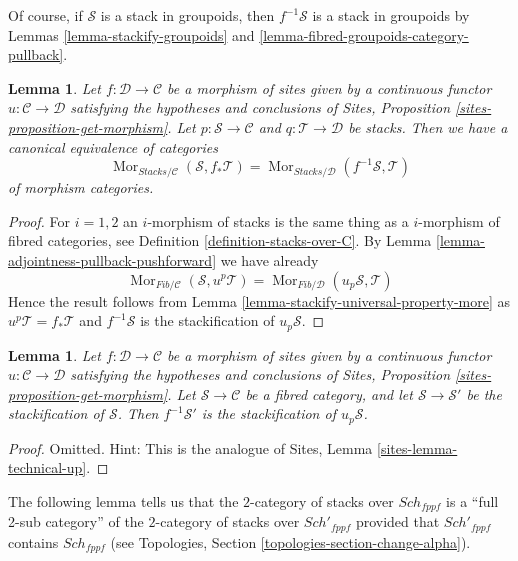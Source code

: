 \documentclass{stacks-project}
\theoremstyle{plain}
\newtheorem{lemma}[subsection]{Lemma}
\theoremstyle{definition}
\theoremstyle{remark}
\numberwithin{equation}{subsection}
\def\Sch{\mathit{Sch}}
\def\Mor{\mathop{\mathrm{Mor}}\nolimits}
\begin{document}
\noindent
Of course, if $\mathcal{S}$ is a stack in groupoids, then $f^{-1}\mathcal{S}$
is a stack in groupoids by
Lemmas \ref{lemma-stackify-groupoids} and
\ref{lemma-fibred-groupoids-category-pullback}.

\begin{lemma}
\label{lemma-adjointness-pullback-pushforward-stacks}
Let $f : \mathcal{D} \to \mathcal{C}$ be a morphism of sites
given by a continuous functor $u : \mathcal{C} \to \mathcal{D}$
satisfying the hypotheses and conclusions of
Sites, Proposition \ref{sites-proposition-get-morphism}.
Let $p : \mathcal{S} \to \mathcal{C}$ and
$q : \mathcal{T} \to \mathcal{D}$ be stacks.
Then we have a canonical equivalence of categories
$$
\Mor_{\textit{Stacks}/\mathcal{C}}(\mathcal{S}, f_*\mathcal{T})
=
\Mor_{\textit{Stacks}/\mathcal{D}}(f^{-1}\mathcal{S}, \mathcal{T})
$$
of morphism categories.
\end{lemma}

\begin{proof}
For $i = 1, 2$ an $i$-morphism of stacks is the same thing as a
$i$-morphism of fibred categories, see
Definition \ref{definition-stacks-over-C}.
By
Lemma \ref{lemma-adjointness-pullback-pushforward}
we have already
$$
\Mor_{\textit{Fib}/\mathcal{C}}(\mathcal{S}, u^p\mathcal{T})
=
\Mor_{\textit{Fib}/\mathcal{D}}(u_p\mathcal{S}, \mathcal{T})
$$
Hence the result follows from
Lemma \ref{lemma-stackify-universal-property-more}
as $u^p\mathcal{T} = f_*\mathcal{T}$ and $f^{-1}\mathcal{S}$ is the
stackification of $u_p\mathcal{S}$.
\end{proof}

\begin{lemma}
\label{lemma-technical-up}
Let $f : \mathcal{D} \to \mathcal{C}$ be a morphism of sites
given by a continuous functor $u : \mathcal{C} \to \mathcal{D}$
satisfying the hypotheses and conclusions of
Sites, Proposition \ref{sites-proposition-get-morphism}.
Let $\mathcal{S} \to \mathcal{C}$ be a fibred category, and
let $\mathcal{S} \to \mathcal{S}'$ be the stackification of $\mathcal{S}$.
Then $f^{-1}\mathcal{S}'$ is the stackification of
$u_p\mathcal{S}$.
\end{lemma}

\begin{proof}
Omitted. Hint:
This is the analogue of Sites, Lemma \ref{sites-lemma-technical-up}.
\end{proof}

\noindent
The following lemma tells us that the $2$-category of stacks
over $\Sch_{fppf}$ is a ``full 2-sub category'' of the
$2$-category of stacks over $\Sch'_{fppf}$ provided that
$\Sch'_{fppf}$ contains $\Sch_{fppf}$ (see
Topologies, Section \ref{topologies-section-change-alpha}).
\end{document}
